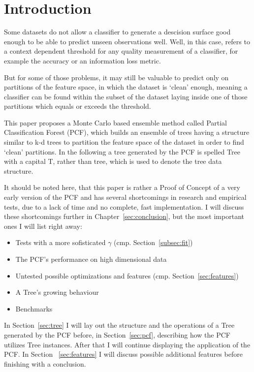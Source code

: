 \section{Introduction}

Some datasets do not allow a classifier to generate a
descision surface good enough to be able to predict unseen
observations well. Well, in this case, refers to a
context dependent threshold for any quality measurement of
a classifier, for example the accuracy or an information
loss metric.

But for some of those problems, it may still be valuable
to predict only on partitions of the feature space, in
which the dataset is `clean' enough, meaning a classifier
can be found within the subset of the dataset laying inside
one of those partitions which equals or exceeds the
threshold.

This paper proposes a Monte Carlo based ensemble method
called Partial Classification Forest (PCF), which builds an
ensemble of trees having a structure similar to
k-d trees to partition the feature space of the dataset in
order to find `clean' partitions. In the following a
tree generated by the PCF is spelled Tree with a capital
T, rather than tree, which is used to denote the tree data
structure.

It should be noted here, that this paper is rather a Proof
of Concept of a very early version of the PCF and has
several shortcomings in research and empirical tests, due
to a lack of time and no complete, fast implementation. I
will discuss these shortcomings further in
Chapter~\ref{sec:conclusion}, but the most important ones I
will list right away:

\begin{itemize}

\item Tests with a more sofisticated $\gamma$ (cmp.
      Section~\ref{subsec:fit})

\item The PCF's performance on high dimensional data

\item Untested possible optimizations and features (cmp.
      Section~\ref{sec:features})

\item A Tree's growing behaviour

\item Benchmarks

\end{itemize}

In Section~\ref{sec:tree} I will lay out
the structure and the operations of a Tree generated by the
PCF before, in Section~\ref{sec:pcf}, describing how the
PCF utilizes Tree instances. After that I will continue
displaying the application of the PCF\@. In Section~%
\ref{sec:features} I will discuss possible additional
features before finishing with a conclusion.
